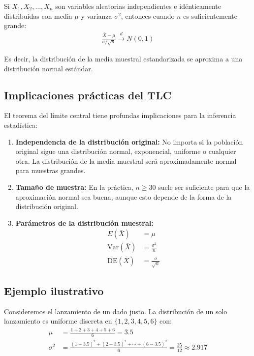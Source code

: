 \begin{teorema}
	Si $X_1, X_2, \ldots, X_n$ son variables aleatorias independientes e idénticamente distribuidas con media $\mu$ y varianza $\sigma^2$, entonces cuando $n$ es suficientemente grande:
	\begin{align}
		\frac{\bar{X} - \mu}{\sigma/\sqrt{n}} \xrightarrow{d} N(0,1)
	\end{align}
	
	Es decir, la distribución de la media muestral estandarizada se aproxima a una distribución normal estándar.
\end{teorema}

\subsection{Implicaciones prácticas del TLC}

El teorema del límite central tiene profundas implicaciones para la inferencia estadística:

\begin{enumerate}
	\item \textbf{Independencia de la distribución original:} No importa si la población original sigue una distribución normal, exponencial, uniforme o cualquier otra. La distribución de la media muestral será aproximadamente normal para muestras grandes.
	
	\item \textbf{Tamaño de muestra:} En la práctica, $n \geq 30$ suele ser suficiente para que la aproximación normal sea buena, aunque esto depende de la forma de la distribución original.
	
	\item \textbf{Parámetros de la distribución muestral:}
	\begin{align}
		E(\bar{X}) &= \mu \\
		\text{Var}(\bar{X}) &= \frac{\sigma^2}{n} \\
		\text{DE}(\bar{X}) &= \frac{\sigma}{\sqrt{n}}
	\end{align}
\end{enumerate}

\subsection{Ejemplo ilustrativo}

Consideremos el lanzamiento de un dado justo. La distribución de un solo lanzamiento es uniforme discreta en $\{1, 2, 3, 4, 5, 6\}$ con:
\begin{align}
	\mu &= \frac{1+2+3+4+5+6}{6} = 3.5 \\
	\sigma^2 &= \frac{(1-3.5)^2 + (2-3.5)^2 + \cdots + (6-3.5)^2}{6} = \frac{35}{12} \approx 2.917
\end{align}

